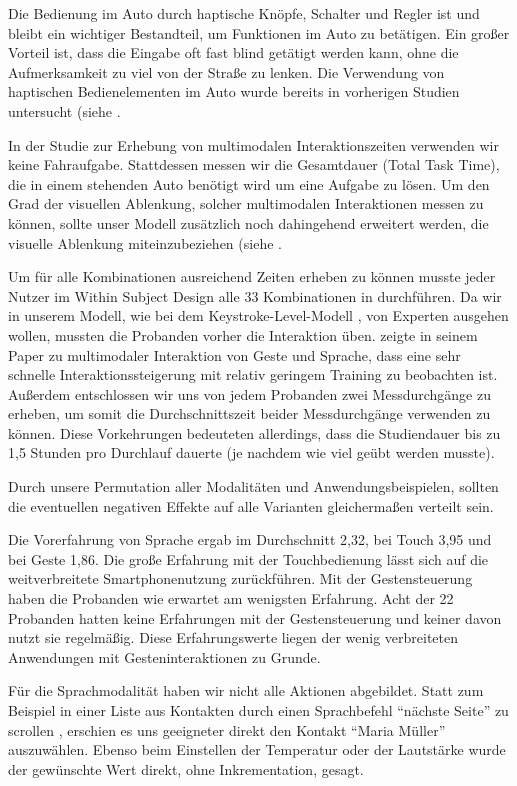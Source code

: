 Die Bedienung im Auto durch haptische Knöpfe, Schalter und Regler ist und bleibt ein wichtiger Bestandteil, um Funktionen im Auto zu betätigen. 
Ein großer Vorteil ist, dass die Eingabe oft fast blind getätigt werden kann, ohne die Aufmerksamkeit zu viel von der Straße zu lenken. 
Die Verwendung von haptischen Bedienelementen im Auto wurde bereits in vorherigen Studien untersucht (siehe \citep{Pettitt_2007,schneegass_2009,SchneegaB_2011}. 

In der Studie zur Erhebung von multimodalen Interaktionszeiten verwenden wir keine Fahraufgabe. Stattdessen messen wir die Gesamtdauer (Total Task Time), die in einem stehenden Auto benötigt wird um eine Aufgabe zu lösen. Um den Grad der visuellen Ablenkung, solcher multimodalen Interaktionen messen zu können, sollte unser Modell zusätzlich noch dahingehend erweitert werden, die visuelle Ablenkung miteinzubeziehen (siehe \citep{Pettitt_2007}.
 
Um für alle Kombinationen ausreichend Zeiten erheben zu können musste jeder Nutzer im Within Subject Design alle 33 Kombinationen in durchführen.
Da wir in unserem Modell, wie bei dem Keystroke-Level-Modell \citep{Card_1980}, von Experten ausgehen wollen, mussten die Probanden vorher die Interaktion üben. 
\citet{Jude:2014} zeigte in seinem Paper zu multimodaler Interaktion von Geste und Sprache, dass eine sehr schnelle Interaktionssteigerung mit relativ geringem Training zu beobachten ist. 
Außerdem entschlossen wir uns von jedem Probanden zwei Messdurchgänge zu erheben, um somit die Durchschnittszeit beider Messdurchgänge verwenden zu können. 
Diese Vorkehrungen bedeuteten allerdings, dass die Studiendauer bis zu 1,5 Stunden pro Durchlauf dauerte (je nachdem wie viel geübt werden musste). 

Durch unsere Permutation aller Modalitäten und Anwendungsbeispielen, sollten die eventuellen negativen Effekte auf alle Varianten gleichermaßen verteilt sein.

Die Vorerfahrung von Sprache ergab im Durchschnitt 2,32, bei Touch 3,95 und bei Geste 1,86. Die große Erfahrung mit der Touchbedienung lässt sich auf die weitverbreitete Smartphonenutzung zurückführen. Mit der Gestensteuerung haben die Probanden wie erwartet am wenigsten Erfahrung. Acht der 22 Probanden hatten keine Erfahrungen mit der Gestensteuerung und keiner davon nutzt sie regelmäßig. Diese Erfahrungswerte liegen der wenig verbreiteten Anwendungen mit Gesteninteraktionen zu Grunde.

Für die Sprachmodalität haben wir nicht alle Aktionen abgebildet. 
Statt zum Beispiel in einer Liste aus Kontakten durch einen Sprachbefehl "`nächste Seite"' zu scrollen , erschien es uns geeigneter direkt den Kontakt "`Maria Müller"' auszuwählen. Ebenso beim Einstellen der Temperatur oder der Lautstärke wurde der gewünschte Wert direkt, ohne Inkrementation, gesagt.

